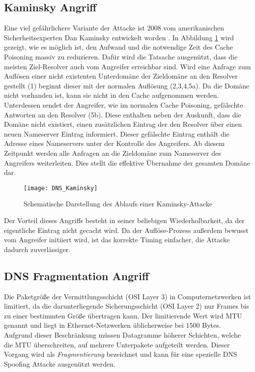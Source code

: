 \subsection{Kaminsky Angriff}
Eine viel gefährlichere Variante der Attacke ist 2008 vom amerikanischen Sicherheitsexperten Dan Kaminsky entwickelt worden \cite{Son2010}. In Abbildung \ref{img:dnskaminsky} wird gezeigt, wie es möglich ist, den Aufwand und die notwendige Zeit des Cache Poisoning massiv zu reduzieren. Dafür wird die Tatsache ausgenützt, dass die meisten Ziel-Resolver auch vom Angreifer erreichbar sind. Wird eine Anfrage zum Auflösen einer nicht existenten Unterdomäne der Zieldomäne an den Resolver gestellt (1) beginnt dieser mit der normalen Auflösung (2,3,4,5a). Da die Domäne nicht vorhanden ist, kann sie nicht in den Cache aufgenommen werden. Unterdessen sendet der Angreifer, wie im normalen Cache Poisoning, gefälschte Antworten an den Resolver (5b). Diese enthalten neben der Auskunft, dass die Domäne nicht existiert, einen zusätzlichen Eintrag der den Resolver über einen neuen Nameserver Eintrag informiert. Dieser gefälschte Eintrag enthält die Adresse eines Nameservers unter der Kontrolle des Angreifers. Ab diesem Zeitpunkt werden alle Anfragen an die Zieldomäne zum Nameserver des Angreifers weiterleiten. Dies stellt die effektive Übernahme der gesamten Domäne dar.

\begin{figure}[!hb]
    \centering
    \texttt{[image: DNS\_Kaminsky]}
    \caption{Schematische Darstellung des Ablaufs einer Kaminsky-Attacke}
    \label{img:dnskaminsky}
\end{figure}

Der Vorteil dieses Angriffs besteht in seiner beliebigen Wiederholbarkeit, da der eigentliche Eintrag nicht gecacht wird. Da der Auflöse-Prozess außerdem bewusst vom Angreifer initiiert wird, ist das korrekte Timing einfacher, die Attacke dadurch zuverlässiger.

\subsection{DNS Fragmentation Angriff}
Die Paketgröße der Vermittlungsschicht (OSI Layer 3) in Computernetzwerken ist limitiert, da die darunterliegende Sicherungsschicht (OSI Layer 2) nur Frames bis zu einer bestimmten Größe übertragen kann. Der limitierende Wert wird \ac{MTU} genannt und liegt in Ethernet-Netzwerken üblicherweise bei 1500 Bytes. Aufgrund dieser Beschränkung müssen Datagramme höherer Schichten, welche die MTU überschreiten, auf mehrere Unterpakete aufgeteilt werden. Dieser Vorgang wird als \textit{Fragmentierung} bezeichnet und kann für eine spezielle DNS Spoofing Attacke ausgenützt werden.

